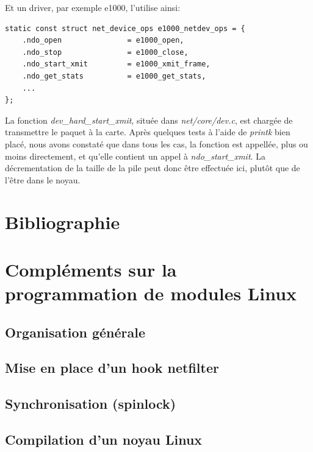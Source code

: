 \documentclass[a4paper]{article}
\begin{document}
Et un driver, par exemple e1000, l'utilise ainsi:
\begin{verbatim}
static const struct net_device_ops e1000_netdev_ops = {
    .ndo_open               = e1000_open,
    .ndo_stop               = e1000_close,
    .ndo_start_xmit         = e1000_xmit_frame,
    .ndo_get_stats          = e1000_get_stats,
    ...
};
\end{verbatim}

La fonction \textit{dev\_hard\_start\_xmit}, située dans
\textit{net/core/dev.c}, est chargée de transmettre le paquet
à la carte. Après quelques tests à l'aide de \textit{printk} bien
placé, nous avons constaté que dans tous les cas, la fonction
est appellée, plus ou moins directement, et qu'elle contient 
un appel à \textit{ndo\_start\_xmit}. La décrementation de la
taille de la pile peut donc être effectuée ici, plutôt que de
l'être dans le noyau.

\section{Bibliographie}

\newpage
\appendix

\section{Compléments sur la programmation de modules Linux}
\subsection{Organisation générale}
\subsection{Mise en place d'un hook netfilter}
\subsection{Synchronisation (spinlock)}
\subsection{Compilation d'un noyau Linux}

\newpage


\end{document}
